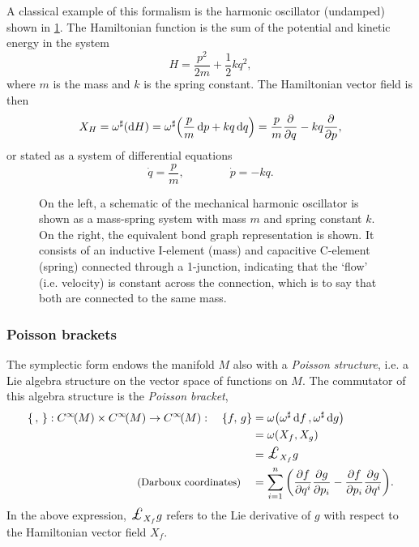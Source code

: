 A classical example of this formalism is the harmonic oscillator (undamped) shown in \cref{fig:ho}. The Hamiltonian function is the sum of the potential and kinetic energy in the system
\begin{equation}
     H = \frac{p^2}{2m} + \frac{1}{2}kq^2,
\end{equation}
where \(m\) is the mass and \(k\) is the spring constant. The Hamiltonian vector field is then 
\begin{equation}
     X_H = \omega^\sharp\qty(\dd{H}) = \omega^\sharp\qty(\frac{p}{m}\dd{p} + kq\dd{q}) = \frac{p}{m}\pdv{}{q} - kq \pdv{}{p},
\end{equation}
or stated as a system of differential equations
\begin{equation}
     \dot{q} = \frac{p}{m}, \qquad \qquad \dot{p} = -kq.
\end{equation}
\begin{figure}[ht]
    \centering
    
    \caption{On the left, a schematic of the mechanical harmonic oscillator is shown as a mass-spring system with mass \(m\) and spring constant \(k\). On the right, the equivalent bond graph representation is shown. It consists of an inductive I-element (mass) and capacitive C-element (spring) connected through a 1-junction, indicating that the `flow' (i.e. velocity) is constant across the connection, which is to say that both are connected to the same mass.}
    \label{fig:ho}
\end{figure}

\subsubsection{Poisson brackets}
The symplectic form endows the manifold \(M\) also with a \emph{Poisson structure}, i.e. a Lie algebra structure on the vector space of functions on \(M\). The commutator of this algebra structure is the \emph{Poisson bracket},
\begin{equation}
    \begin{split}
        \poisson{\,}{}: \functions{M} \times \functions{M} \to \functions{M}: \quad  
        \poisson{f}{g} &= \omega\qty(\fromDual{\omega}\dd{f}, \fromDual{\omega}\dd{g})  \\
                       &= \omega\qty(X_f, X_g) \\
                       &= \lied{X_f}{g} \\
        \text{\small (Darboux coordinates)} \quad &= \sum_{i = 1}^n \qty(\pdv{f}{q^i}\pdv{g}{p_i} - \pdv{f}{p_i}\pdv{g}{q^i}).
    \end{split}
\end{equation}
In the above expression, $\lied{X_f}{g}$ refers to the Lie derivative of $g$ with respect to the Hamiltonian vector field $X_f$. 

